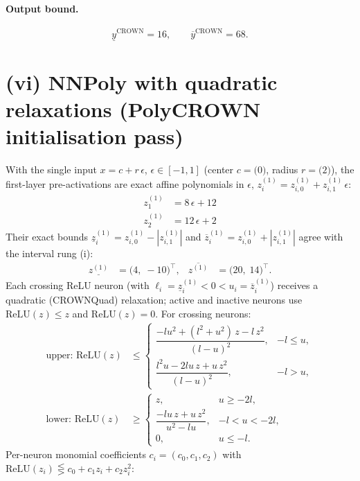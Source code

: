 \documentclass[11pt]{article}
\begin{document}
\paragraph{Output bound.}
\begin{equation*}
\underline{y}^{\text{CROWN}} = 16, \qquad \overline{y}^{\text{CROWN}} = 68.
\end{equation*}

\section{(vi) NNPoly with quadratic relaxations (PolyCROWN initialisation pass)}
With the single input $x = c + r\,\epsilon$, $\epsilon \in [-1, 1]$ (center $c = \bigl(0\bigr)$, radius $r = \bigl(2\bigr)$), the first-layer pre-activations are exact affine polynomials in $\epsilon$, $z^{(1)}_i = z^{(1)}_{i,0} + z^{(1)}_{i,1}\,\epsilon$:
\begin{align*}
z^{(1)}_{1} &= 8\,\epsilon + 12 \\
z^{(1)}_{2} &= 12\,\epsilon + 2
\end{align*}
Their exact bounds $\underline{z}^{(1)}_i = z^{(1)}_{i,0} - |z^{(1)}_{i,1}|$ and $\overline{z}^{(1)}_i = z^{(1)}_{i,0} + |z^{(1)}_{i,1}|$ agree with the interval rung (i):
\begin{align*}
\underline{z^{(1)}} &= \bigl(4,\; -10\bigr)^{\!\top}, & \overline{z^{(1)}} &= \bigl(20,\; 14\bigr)^{\!\top}.
\end{align*}
Each crossing ReLU neuron (with $\ell_i = \underline{z}^{(1)}_i < 0 < u_i = \overline{z}^{(1)}_i$)
receives a quadratic (CROWNQuad) relaxation; active and inactive neurons use $\mathrm{ReLU}(z) \le z$
and $\mathrm{ReLU}(z) = 0$. For crossing neurons:
\begin{align*}
\text{upper: } \mathrm{ReLU}(z) &\le \begin{cases} \dfrac{-l u^2 + (l^2 + u^2)\, z - l\, z^2}{(l - u)^2}, & -l \le u, \\[3mm] \dfrac{l^2 u - 2 l u\, z + u\, z^2}{(l - u)^2}, & -l > u, \end{cases} \\[2mm]
\text{lower: } \mathrm{ReLU}(z) &\ge \begin{cases} z, & u \ge -2l, \\[3mm] \dfrac{-l u\, z + u\, z^2}{u^2 - l u}, & -l < u < -2l, \\[3mm] 0, & u \le -l. \end{cases}
\end{align*}
Per-neuron monomial coefficients $c_i = (c_0, c_1, c_2)$ with $\mathrm{ReLU}(z_i) \lesseqgtr c_0 + c_1 z_i + c_2 z_i^2$:
\end{document}
